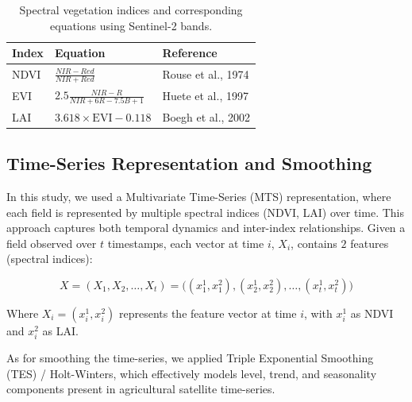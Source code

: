 \documentclass{article} %
\begin{document}
                \begin{table}[ht]
                \centering
                \caption{Spectral vegetation indices and corresponding equations using Sentinel-2 bands.}
                \label{tab:veg_indices}
                \renewcommand{\arraystretch}{1.4}
                \small
                    \begin{tabular}{p{3cm} p{3cm} p{3cm}}
                    \textbf{Index} & \textbf{Equation} & \textbf{Reference} \\
                    \hline
                    NDVI & 
                    $\frac{NIR - Red}{NIR + Red}$ & 
                    Rouse et al., 1974 \\

                    EVI & 
                    $2.5 \frac{NIR - R}{NIR + 6R - 7.5B + 1}$ & 
                    Huete et al., 1997 \\

                    LAI &
                    $3.618 \times \text{EVI} - 0.118$ & 
                    Boegh et al., 2002 \\
                    \end{tabular}
                \end{table}

    \subsection{Time-Series Representation and Smoothing}
        In this study, we used a Multivariate Time-Series (MTS) representation, where each field is represented by multiple spectral indices (NDVI, LAI) over time. This approach captures both temporal dynamics and inter-index relationships. Given a field observed over $t$ timestamps, each vector at time $i$, $X_i$, contains $2$ features (spectral indices):

        \begin{equation}
        X = (X_1, X_2, \ldots, X_t)
        = \bigl(
            (x_1^1, x_1^2),
            (x_2^1, x_2^2),
            \ldots,
            (x_t^1, x_t^2)
            \bigr)
        \end{equation}

        Where $X_i = (x_i^1, x_i^2)$ represents the feature vector at time $i$, with $x_i^1$ as NDVI and $x_i^2$ as LAI.

        As for smoothing the time-series, we applied Triple Exponential Smoothing (TES) / Holt-Winters, which effectively models level, trend, and seasonality components present in agricultural satellite time-series.
\end{document}
